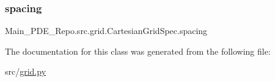 \subsubsection{\texorpdfstring{spacing}{spacing}}
{\footnotesize\ttfamily Main\+\_\+\+P\+D\+E\+\_\+\+Repo.\+src.\+grid.\+Cartesian\+Grid\+Spec.\+spacing}



The documentation for this class was generated from the following file\+:\begin{DoxyCompactItemize}
\item 
src/\hyperlink{grid_8py}{grid.\+py}\end{DoxyCompactItemize}
